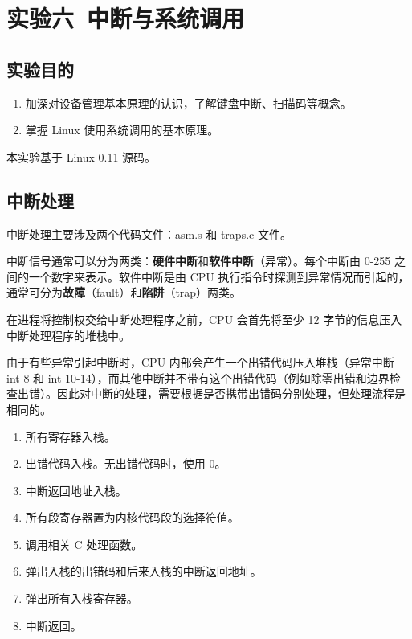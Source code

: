 \section{实验六\ 中断与系统调用}

\subsection{实验目的}

\begin{enumerate}
    \item 加深对设备管理基本原理的认识，了解键盘中断、扫描码等概念。
    \item 掌握 Linux 使用系统调用的基本原理。
\end{enumerate}

本实验基于 Linux 0.11 源码。

\subsection{中断处理}

中断处理主要涉及两个代码文件：asm.s 和 traps.c 文件。

中断信号通常可以分为两类：\textbf{硬件中断}和\textbf{软件中断}（异常）。每个中断由 0-255 之间的一个数字来表示。软件中断是由 CPU 执行指令时探测到异常情况而引起的，通常可分为\textbf{故障}（fault）和\textbf{陷阱}（trap）两类。

在进程将控制权交给中断处理程序之前，CPU 会首先将至少 12 字节的信息压入中断处理程序的堆栈中。

由于有些异常引起中断时，CPU 内部会产生一个出错代码压入堆栈（异常中断 int 8 和 int 10-14），而其他中断并不带有这个出错代码（例如除零出错和边界检查出错）。因此对中断的处理，需要根据是否携带出错码分别处理，但处理流程是相同的。

\begin{enumerate}
    \item 所有寄存器入栈。
    \item 出错代码入栈。无出错代码时，使用 0。
    \item 中断返回地址入栈。
    \item 所有段寄存器置为内核代码段的选择符值。
    \item 调用相关 C 处理函数。
    \item 弹出入栈的出错码和后来入栈的中断返回地址。
    \item 弹出所有入栈寄存器。
    \item 中断返回。
\end{enumerate}

